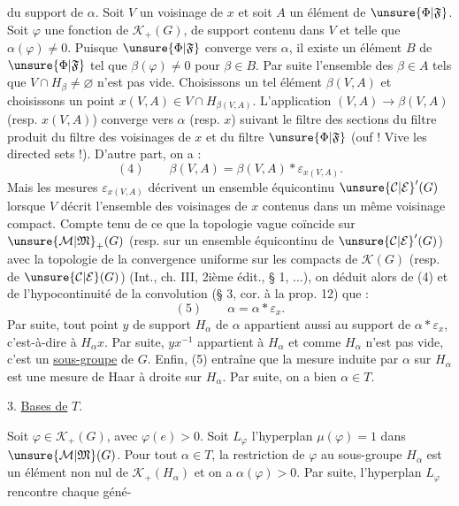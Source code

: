 du support de $\alpha$. Soit $V$ un voisinage de $x$ et soit $A$ un élément de $\unsure{\Phi|\mathfrak F}$. Soit $\varphi$ une fonction de $\mathcal K_+(G)$, de support contenu dans $V$ et telle que $\alpha(\varphi)\ne 0$. Puisque $\unsure{\Phi|\mathfrak F}$ converge vers $\alpha$, il existe un élément $B$ de $\unsure{\Phi|\mathfrak F}$ tel que $\beta(\varphi)\ne 0$ pour $\beta\in B$. Par suite l'ensemble des $\beta\in A$ tels que $V\cap H_\beta\ne\varnothing$ n'est pas vide. Choisissons un tel élément $\beta(V,A)$ et choisissons un point $x(V,A)\in V\cap H_{\beta(V,A)}$. L'application $(V,A)\longrightarrow\beta(V,A)$ (resp. $x(V,A)$) converge vers $\alpha$ (resp. $x$) suivant le filtre des sections du filtre produit du filtre des voisinages de $x$ et du filtre $\unsure{\Phi|\mathfrak F}$ (ouf ! Vive les directed sets !). D'autre part, on a :
\[
(4)\qquad\beta(V,A)=\beta(V,A)*\varepsilon_{x(V,A)}.
\]
Mais les mesures $\varepsilon_{x(V,A)}$ décrivent un ensemble équicontinu $\unsure{\mathcal C|\mathcal E}'(G)$ lorsque $V$ décrit l'ensemble des voisinages de $x$ contenus dans un même voisinage compact. Compte tenu de ce que la topologie vague coïncide sur $\unsure{\mathcal M|\mathfrak M}_+(G)$ (resp. sur un ensemble équicontinu de $\unsure{\mathcal C|\mathcal E}'(G)$) avec la topologie de la convergence uniforme sur les compacts de $\mathcal K(G)$ (resp. de $\unsure{\mathcal C|\mathcal E}(G)$) (Int., ch. III, 2ième édit., § 1, $\ldots$), on déduit alors de (4) et de l'hypocontinuité de la convolution (§ 3, cor. à la prop. 12) que :
\[
(5)\qquad\alpha=\alpha*\varepsilon_x.
\]
Par suite, tout point $y$ de support $H_\alpha$ de $\alpha$ appartient aussi au support de $\alpha*\varepsilon_x$, c'est-à-dire à $H_\alpha x$. Par suite, $yx^{-1}$ appartient à $H_\alpha$ et comme $H_\alpha$ n'est pas vide, c'est un \uline{sous-groupe} de $G$. Enfin, (5) entraîne que la mesure induite par $\alpha$ sur $H_\alpha$ est une mesure de Haar à droite sur $H_\alpha$. Par suite, on a bien $\alpha\in T$.

3. \uline{Bases de} $T$.

Soit $\varphi\in\mathcal K_+(G)$, avec $\varphi(e)>0$. Soit $L_\varphi$ l'hyperplan $\mu(\varphi)=1$ dans $\unsure{\mathcal M|\mathfrak M}(G)$. Pour tout $\alpha\in T$, la restriction de $\varphi$ au sous-groupe $H_\alpha$ est un élément non nul de $\mathcal K_+(H_\alpha)$ et on a $\alpha(\varphi)>0$. Par suite, l'hyperplan $L_\varphi$ rencontre chaque géné-
